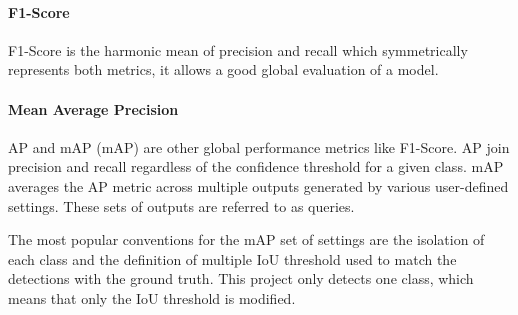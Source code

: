 %

\paragraph{F1-Score}

{
    F1-Score is the harmonic mean of precision and recall which symmetrically represents both metrics, it allows a good global evaluation of a model. 
}



\paragraph{Mean Average Precision}

{
    \ac{AP} and \acl{mAP} (\ac{mAP}) are other global performance metrics like F1-Score. 
    \ac{AP} join precision and recall regardless of the confidence threshold for a given class. 
    \Ac{mAP} averages the \ac{AP} metric across multiple outputs generated by various user-defined settings. 
    These sets of outputs are referred to as queries.
}

{
    The most popular conventions for the \ac{mAP} set of settings are the isolation of each class and the definition of multiple \ac{IoU} threshold used to match the detections with the ground truth. 
    This project only detects one class, which means that only the \ac{IoU} threshold is modified.
}


